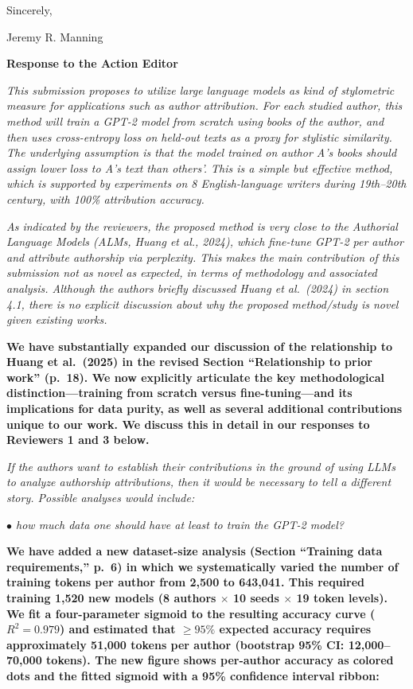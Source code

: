 \documentclass[11pt]{article}
\newcommand{\pref}[1]{p.~#1}
\begin{document}
Sincerely,

Jeremy R. Manning

\newpage


\textbf{\large Response to the Action Editor}

\textit{This submission proposes to utilize large language models as kind of
stylometric measure for applications such as author attribution. For each
studied author, this method will train a GPT-2 model from scratch using books
of the author, and then uses cross-entropy loss on held-out texts as a proxy
for stylistic similarity. The underlying assumption is that the model trained
on author A's books should assign lower loss to A's text than others'. This is
a simple but effective method, which is supported by experiments on 8
English-language writers during 19th--20th century, with 100\% attribution
accuracy.}

\textit{As indicated by the reviewers, the proposed method is very close to the
Authorial Language Models (ALMs, Huang et al., 2024), which fine-tune GPT-2 per
author and attribute authorship via perplexity. This makes the main
contribution of this submission not as novel as expected, in terms of
methodology and associated analysis. Although the authors briefly discussed
Huang et al.\ (2024) in section 4.1, there is no explicit discussion about why
the proposed method/study is novel given existing works.}

\textbf{We have substantially expanded our discussion of the relationship to
Huang et al.\ (2025) in the revised Section ``Relationship to prior work''
(\pref{18}). We now explicitly articulate the key methodological
distinction---training from scratch versus fine-tuning---and its implications
for data purity, as well as several additional contributions unique to our
work. We discuss this in detail in our responses to Reviewers 1 and 3 below.}

\textit{If the authors want to establish their contributions in the ground of
using LLMs to analyze authorship attributions, then it would be necessary to
tell a different story. Possible analyses would include:}

\textit{$\bullet$ how much data one should have at least to train the GPT-2 model?}

\textbf{We have added a new dataset-size analysis (Section ``Training data
requirements,'' \pref{6}) in which we systematically varied the number of
training tokens per author from 2,500 to 643,041. This required training 1,520
new models (8 authors $\times$ 10 seeds $\times$ 19 token levels). We fit a
four-parameter sigmoid to the resulting accuracy curve ($R^2 = 0.979$) and
estimated that $\geq 95\%$ expected accuracy requires approximately 51,000
tokens per author (bootstrap 95\% CI: 12,000--70,000 tokens). The new figure
shows per-author accuracy as colored dots and the fitted sigmoid with a 95\%
confidence interval ribbon:}
\end{document}
